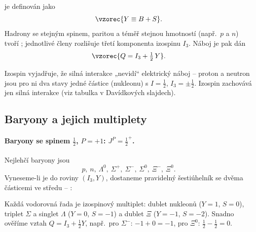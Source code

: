 \begin{definice}
 je definován jako
\[ \vzorec{Y\equiv B+S}. \]
Hadrony se stejným spinem, paritou a téměř stejnou hmotností (např.\ \(p\)
a \(n\)) tvoří ; jednotlivé členy rozlišuje třetí
komponenta izospinu \(I_3\). Náboj je pak dán
\[ \vzorec{Q=I_3+\tfrac12\,Y}. \]
\end{definice}
Izospin vyjadřuje, že silná interakce „nevidí“ elektrický náboj -- proton a
neutron jsou pro ni dva stavy jedné částice (nukleonu) s \(I=\tfrac12\),
\(I_3=\pm\tfrac12\). Izospin zachovává jen silná interakce (viz tabulka
v Davídkových slajdech).

\subsection{Baryony a jejich multiplety}

\paragraph{Baryony se spinem \(\tfrac12\), \(P=+1\): \(J^P=\tfrac12^+\).}
Nejlehčí baryony jsou
\[
  p,\ n,\ \Lambda^0,\ \Sigma^+,\ \Sigma^-,\ \Sigma^0,\ \Xi^-,\ \Xi^0 .
\]
Vyneseme-li je do roviny \((I_3, Y)\), dostaneme pravidelný šestiúhelník se
dvěma částicemi ve středu -- :

\begin{center}
\end{center}
Každá vodorovná řada je izospinový multiplet: dublet nukleonů (\(Y=1\),
\(S=0\)), triplet \(\Sigma\) a singlet \(\Lambda\) (\(Y=0\), \(S=-1\)) a
dublet \(\Xi\) (\(Y=-1\), \(S=-2\)). Snadno ověříme vztah
\(Q=I_3+\tfrac12Y\), např.\ pro \(\Sigma^-\): \(-1+0=-1\), pro \(\Xi^0\):
\(\tfrac12-\tfrac12=0\).

